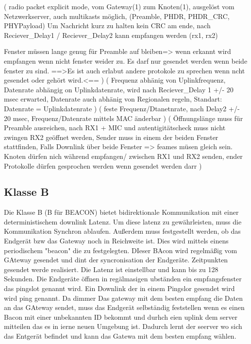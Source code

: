 \documentclass[a4paper,12pt]{article}
\begin{document}
            \cite{LoRaSpec}(
                radio packet explicit mode, vom Gateway(1) zum Knoten(1), ausgelöst vom Netzwerkserver, auch multikasts möglich, (Preamble, PHDR, PHDR\_CRC, PHYPayload)
            Um Nachricht kurz zu halten kein CRC am ende, nach Reciever\_Delay1 / Reciever\_Delay2 kann empfangen werden (rx1, rx2) 
            
            Fenster müssen lange genug für Preamble auf bleiben=> wenn erkannt wird empfangen wenn nicht fenster weider zu. Es darf nur gesendet werden wenn beide fenster zu sind.
            ==>Es ist auch erlabut andere protokole zu sprechen wenn ncht gesendet oder gehört wird.<==
            )
            \cite{LoRaSpec}(
                Frequenz abhänig von Uplinkfrequenz, Datenrate abhängig on Uplinkdatenrate, wird nach Reciever\_Delay 1 +/- 20 msec erwarted, Datenrate auch abhänig von Regionalen regeln, Standart: Datenrate = Uplinkdatenrate
            )
            \cite{LoRaSpec}(
                feste Frequenz/Dtanetnrate, nach Delay2 +/- 20 msec, Frequenz/Datenrate mittels MAC änderbar
            )
            \cite{LoRaSpec}(
                Öffnungslänge muss für Preamble ausreichen, nach RX1 + MIC und autentigitätscheck muss nicht zwingen RX2 geöffnet werden, Sender muss in einem der beiden Fenster stattfinden, Falls Downlink über beide Fenster => feames müsen gleich sein. Knoten dürfen nich während empfangen/ zwischen RX1 und RX2 senden, ender Protokolle dürfen gesprochen werden wenn gesendet werden darr
            )
        \subsection{Klasse B}
            Die Klasse B (B für BEACON) bietet bidirektionale Kommunikation mit einer deterministischem downlink Latenz. Um diese latenz zu gewährleisten, muss die Kommunikation Synchron ablaufen. Außerdem muss festgestellt werden, ob das Endgerät bzw das Gateway noch in Reichweite ist. Dies wird mittels einens periodischem "beacon" die zu festgelegten.
            DIeser BAcon wird regelmäßig vom GAteway gesendet und dint der syncronisation der Endgeräte.
            Zeitpunkten gesendet werde realisiert. Die Latenz ist einstellbar und kann bis zu 128 Sekunden.
            Die Endgeräte öffnen in regälmasigen ubständen ein empfangsfenster das pingslot genannt wird. Ein Downlink der in einem Pingslor gesendet wird wird ping genannt. Da dimmer Das gateway mit dem besten empfang die Daten an das GAteway sendet, muss das Endgerät selbständig feststellen wenn es einen Bacon mit einer unbekannten ID bekommt und durhch eien uplink dem server mitteilen das es in ierne neuen Umgebung ist. Dadurch lernt der seerver
            wo sich das Entgerät befindet und kann das Gatewa mit dem besten empfang wählen.
\end{document}
